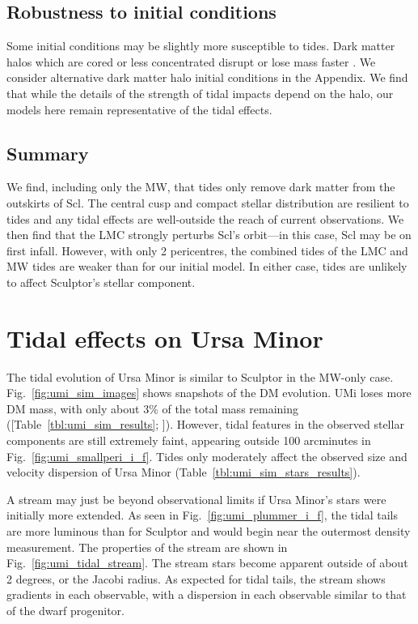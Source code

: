 \subsection{Robustness to initial
conditions}\label{robustness-to-initial-conditions}

Some initial conditions may be slightly more susceptible to tides. Dark
matter halos which are cored or less concentrated disrupt or lose mass
faster \citep[e.g.,][]{stucker+2023}. We consider alternative dark
matter halo initial conditions in the Appendix. We find that while the
details of the strength of tidal impacts depend on the halo, our models
here remain representative of the tidal effects.

\subsection{Summary}\label{summary}

We find, including only the MW, that tides only remove dark matter from
the outskirts of Scl. The central cusp and compact stellar distribution
are resilient to tides and any tidal effects are well-outside the reach
of current observations. We then find that the LMC strongly perturbs
Scl's orbit---in this case, Scl may be on first infall. However, with
only 2 pericentres, the combined tides of the LMC and MW tides are
weaker than for our initial model. In either case, tides are unlikely to
affect Sculptor's stellar component.

\section{Tidal effects on Ursa Minor}\label{tidal-effects-on-ursa-minor}

The tidal evolution of Ursa Minor is similar to Sculptor in the MW-only
case. Fig.~\ref{fig:umi_sim_images} shows snapshots of the DM evolution.
UMi loses more DM mass, with only about 3\% of the total mass remaining
({[}Table~\ref{tbl:umi_sim_results}; {]}). However, tidal features in
the observed stellar components are still extremely faint, appearing
outside 100 arcminutes in Fig.~\ref{fig:umi_smallperi_i_f}. Tides only
moderately affect the observed size and velocity dispersion of Ursa
Minor (Table~\ref{tbl:umi_sim_stars_results}).

A stream may just be beyond observational limits if Ursa Minor's stars
were initially more extended. As seen in Fig.~\ref{fig:umi_plummer_i_f},
the tidal tails are more luminous than for Sculptor and would begin near
the outermost density measurement. The properties of the stream are
shown in Fig.~\ref{fig:umi_tidal_stream}. The stream stars become
apparent outside of about 2 degrees, or the Jacobi radius. As expected
for tidal tails, the stream shows gradients in each observable, with a
dispersion in each observable similar to that of the dwarf progenitor.

